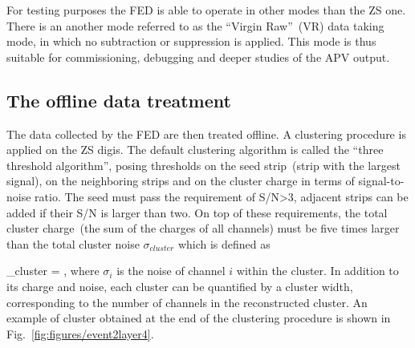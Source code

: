 For testing purposes the FED is able to operate in other modes than the ZS one. There is an another mode referred to as the ``Virgin Raw''~(VR) data taking mode, in which no subtraction or suppression is applied. This mode is thus suitable for commissioning, debugging and deeper studies of the APV output.





\subsection{The offline data treatment~\label{sec:localreco}}


The data collected by the FED are then treated offline. A clustering procedure is applied on the ZS digis. The default clustering algorithm is called the ``three threshold algorithm'', posing thresholds on the seed strip~(strip with the largest signal), on the neighboring strips and on the cluster charge in terms of signal-to-noise ratio. The seed must pass the requirement of S/N>3, adjacent strips can be added if their S/N is larger than two. On top of these requirements, the total cluster charge~(the sum of the charges of all channels) must be five times larger than the total cluster noise $\sigma_{cluster}$ which is defined as


{
    \sigma_{cluster} = ,
}
where $\sigma_{i}$ is the noise of channel $i$ within the cluster. In addition to its charge and noise, each cluster can be quantified by a cluster width, corresponding to the number of channels in the reconstructed cluster. An example of cluster obtained at the end of the clustering procedure is shown in Fig.~\ref{fig:figures/event2layer4}.

